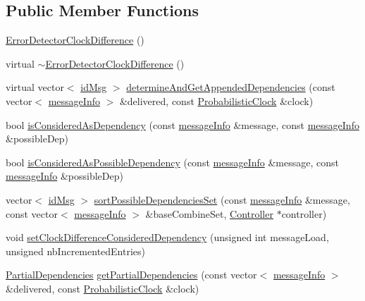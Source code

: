 \subsection*{Public Member Functions}
\begin{DoxyCompactItemize}
\item 
\hyperlink{class_error_detector_clock_difference_a5edb355be9179cd604d3e7f946846c55}{Error\+Detector\+Clock\+Difference} ()
\item 
virtual \hyperlink{class_error_detector_clock_difference_a19bda307bcb9a8974a97fdf56fb77b8f}{$\sim$\+Error\+Detector\+Clock\+Difference} ()
\item 
virtual vector$<$ \hyperlink{structures_8h_a83a1d9a070efa5341da84cfd8e28d3e5}{id\+Msg} $>$ \hyperlink{class_error_detector_clock_difference_a15406c8d7652f3b9358b1958d3723933}{determine\+And\+Get\+Appended\+Dependencies} (const vector$<$ \hyperlink{structures_8h_a7e7bdc1d2fff8a9436f2f352b2711ed6}{message\+Info} $>$ \&delivered, const \hyperlink{class_probabilistic_clock}{Probabilistic\+Clock} \&clock)
\item 
bool \hyperlink{class_error_detector_clock_difference_a4d399849b1872d3273fa757ee9dc9bd9}{is\+Considered\+As\+Dependency} (const \hyperlink{structures_8h_a7e7bdc1d2fff8a9436f2f352b2711ed6}{message\+Info} \&message, const \hyperlink{structures_8h_a7e7bdc1d2fff8a9436f2f352b2711ed6}{message\+Info} \&possible\+Dep)
\item 
bool \hyperlink{class_error_detector_clock_difference_ab20aa1671eb558dea6f06b2440e97e41}{is\+Considered\+As\+Possible\+Dependency} (const \hyperlink{structures_8h_a7e7bdc1d2fff8a9436f2f352b2711ed6}{message\+Info} \&message, const \hyperlink{structures_8h_a7e7bdc1d2fff8a9436f2f352b2711ed6}{message\+Info} \&possible\+Dep)
\item 
vector$<$ \hyperlink{structures_8h_a83a1d9a070efa5341da84cfd8e28d3e5}{id\+Msg} $>$ \hyperlink{class_error_detector_clock_difference_a740f6bd74b30e0b194c4b64d79bb8caf}{sort\+Possible\+Dependencies\+Set} (const \hyperlink{structures_8h_a7e7bdc1d2fff8a9436f2f352b2711ed6}{message\+Info} \&message, const vector$<$ \hyperlink{structures_8h_a7e7bdc1d2fff8a9436f2f352b2711ed6}{message\+Info} $>$ \&base\+Combine\+Set, \hyperlink{class_controller}{Controller} $\ast$controller)
\item 
void \hyperlink{class_error_detector_clock_difference_a529b87b6eaee9041601af1ca36b51c93}{set\+Clock\+Difference\+Considered\+Dependency} (unsigned int message\+Load, unsigned nb\+Incremented\+Entries)
\item 
\hyperlink{class_partial_dependencies}{Partial\+Dependencies} \hyperlink{class_error_detector_clock_difference_a26f4c2905859947201d0a18146f2e961}{get\+Partial\+Dependencies} (const vector$<$ \hyperlink{structures_8h_a7e7bdc1d2fff8a9436f2f352b2711ed6}{message\+Info} $>$ \&delivered, const \hyperlink{class_probabilistic_clock}{Probabilistic\+Clock} \&clock)
\end{DoxyCompactItemize}
